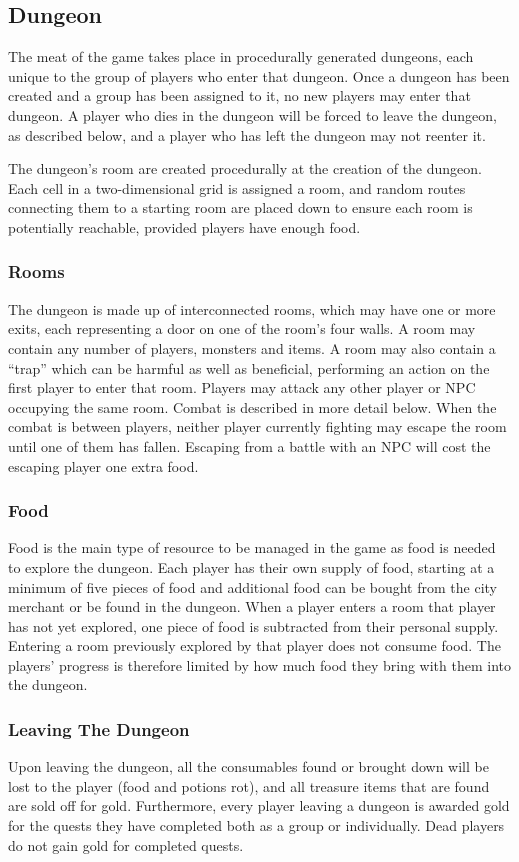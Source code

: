 \documentclass[a4paper]{article}
\begin{document}
\subsection{Dungeon}
The meat of the game takes place in procedurally generated dungeons, each unique to the group of players who enter that dungeon. Once a dungeon has been created and a group has 
been assigned to it, no new players may enter that dungeon. A player who dies in the dungeon will be forced to leave the dungeon, as described below, and a player who has left the dungeon 
may not reenter it.

The dungeon's room are created procedurally at the creation of the dungeon. Each cell in a two-dimensional grid is assigned a room, and random routes connecting them to a starting room are placed 
down to ensure each room is potentially reachable, provided players have enough food.
\subsubsection{Rooms}
The dungeon is made up of interconnected rooms, which may have one or more exits, each representing a door on one of the room's four walls. A room may contain any number of players, monsters 
and items. A room may also contain a ``trap'' which can be harmful as well as beneficial, performing an action on the first player to enter that room. Players may attack any other player or 
NPC occupying the same room. Combat is described in more detail below. When the combat is between players, neither player currently fighting may escape the room until one of them has fallen. 
Escaping from a battle with an NPC will cost the escaping player one extra food.
\subsubsection{Food}
Food is the main type of resource to be managed in the game as food is needed to explore the dungeon. Each player has their own supply of food, starting at a minimum of five pieces of food 
and additional food can be bought from the city merchant or be found in the dungeon. When a player enters a room that player has not yet explored, one piece of food is subtracted from their 
personal supply. Entering a room previously explored by that player does not consume food. The players' progress is therefore limited by how much food they bring with them into the dungeon.
\subsubsection{Leaving The Dungeon}
Upon leaving the dungeon, all the consumables found or brought down will be lost to the player (food and potions rot), and all treasure items that are found are sold off for gold. 
Furthermore, every player leaving a dungeon is awarded gold for the quests they have completed both as a group or individually. Dead players do not gain gold for completed quests.
\end{document}
